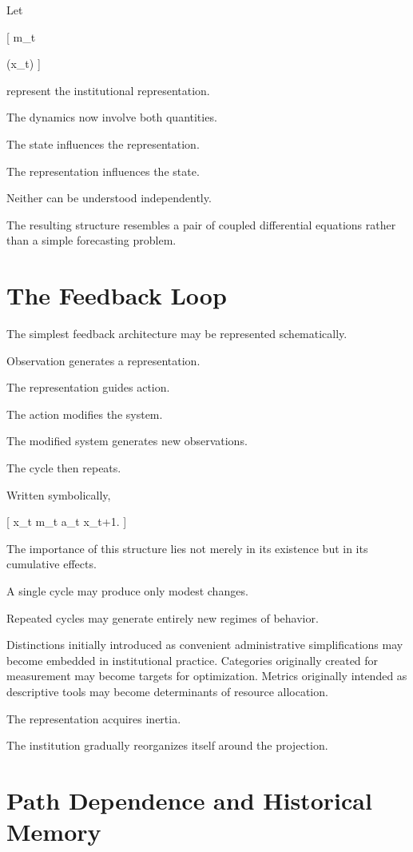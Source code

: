 \documentclass[11pt,oneside,openany]{book}
\begin{document}
Let

[
m_t

\pi(x_t)
]

represent the institutional representation.

The dynamics now involve both quantities.

The state influences the representation.

The representation influences the state.

Neither can be understood independently.

The resulting structure resembles a pair of coupled differential equations rather than a simple forecasting problem.

\section{The Feedback Loop}

The simplest feedback architecture may be represented schematically.

Observation generates a representation.

The representation guides action.

The action modifies the system.

The modified system generates new observations.

The cycle then repeats.

Written symbolically,

[
x_t
\rightarrow
m_t
\rightarrow
a_t
\rightarrow
x_{t+1}.
]

The importance of this structure lies not merely in its existence but in its cumulative effects.

A single cycle may produce only modest changes.

Repeated cycles may generate entirely new regimes of behavior.

Distinctions initially introduced as convenient administrative simplifications may become embedded in institutional practice. Categories originally created for measurement may become targets for optimization. Metrics originally intended as descriptive tools may become determinants of resource allocation.

The representation acquires inertia.

The institution gradually reorganizes itself around the projection.

\section{Path Dependence and Historical Memory}
\end{document}
